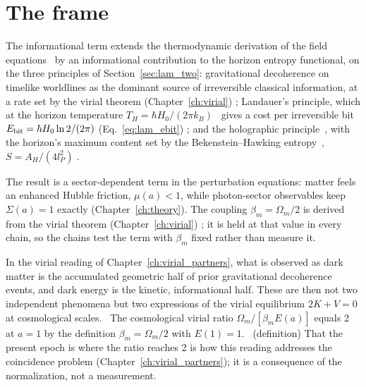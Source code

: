 \section{The frame}\label{sec:bar_frame}
The informational term extends the thermodynamic derivation of the field equations~\cite{Jacobson1995} by an informational contribution
to the horizon entropy functional, on the three principles of Section~\ref{sec:lam_two}: gravitational decoherence on timelike
worldlines as the dominant source of irreversible classical information, at a rate set by the virial theorem (Chapter~\ref{ch:virial})
\interp; Landauer's principle, which at the horizon temperature $T_H=\hbar H_0/(2\pi k_B)$~\cite{GibbonsHawking1977} gives a cost per
irreversible bit $E_{\rm bit}=\hbar H_0\ln2/(2\pi)$ (Eq.~\eqref{eq:lam_ebit}) \derived; and the holographic
principle~\cite{tHooft1993,Susskind1995}, with the horizon's maximum content set by the Bekenstein--Hawking
entropy~\cite{Bekenstein1973,Hawking1975}, $S=A_H/(4l_P^2)$ \derived.

The result is a sector-dependent term in the perturbation equations: matter feels an enhanced Hubble friction, $\mu(a)<1$, while
photon-sector observables keep $\Sigma(a)=1$ exactly (Chapter~\ref{ch:theory}). The coupling $\beta_m=\Omega_m/2$ is derived from the
virial theorem (Chapter~\ref{ch:virial}) \derived; it is held at that value in every chain, so the chains test the term with $\beta_m$
fixed rather than measure it.

In the virial reading of Chapter~\ref{ch:virial_partners}, what is observed as dark matter is the accumulated geometric half of prior
gravitational decoherence events, and dark energy is the kinetic, informational half. These are then not two independent phenomena but
two expressions of the virial equilibrium $2K+V=0$ at cosmological scales. \interp\ The cosmological virial ratio
$\Omega_m/[\beta_mE(a)]$ equals 2 at $a=1$ by the definition $\beta_m=\Omega_m/2$ with $E(1)=1$. \derived\ (definition) That the
present epoch is where the ratio reaches 2 is how this reading addresses the coincidence problem (Chapter~\ref{ch:virial_partners});
it is a consequence of the normalization, not a measurement. \interp


